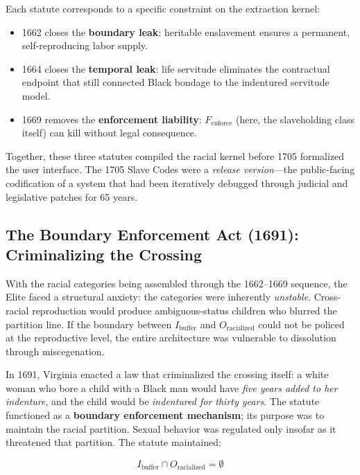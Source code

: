 Each statute corresponds to a specific constraint on the extraction kernel:
\begin{itemize}
    \item 1662 closes the \textbf{boundary leak}: heritable enslavement ensures a permanent, self-reproducing labor supply.
    \item 1664 closes the \textbf{temporal leak}: life servitude eliminates the contractual endpoint that still connected Black bondage to the indentured servitude model.
    \item 1669 removes the \textbf{enforcement liability}: $F_{\text{enforce}}$ (here, the slaveholding class itself) can kill without legal consequence.
\end{itemize}

Together, these three statutes compiled the racial kernel before 1705 formalized the user interface. The 1705 Slave Codes were a \textit{release version}---the public-facing codification of a system that had been iteratively debugged through judicial and legislative patches for 65 years.

\subsection{The Boundary Enforcement Act (1691): Criminalizing the Crossing}

With the racial categories being assembled through the 1662--1669 sequence, the Elite faced a structural anxiety: the categories were inherently \textit{unstable}. Cross-racial reproduction would produce ambiguous-status children who blurred the partition line. If the boundary between $I_{\text{buffer}}$ and $O_{\text{racialized}}$ could not be policed at the reproductive level, the entire architecture was vulnerable to dissolution through miscegenation.

In 1691, Virginia enacted a law that criminalized the crossing itself: a white woman who bore a child with a Black man would have \textit{five years added to her indenture}, and the child would be \textit{indentured for thirty years}. The statute functioned as a \textbf{boundary enforcement mechanism}; its purpose was to maintain the racial partition. Sexual behavior was regulated only insofar as it threatened that partition. The statute maintained:

\begin{equation}\label{eq:3.2-boundary-enforcement-1691}
I_{\text{buffer}} \cap O_{\text{racialized}} = \emptyset
\end{equation}

